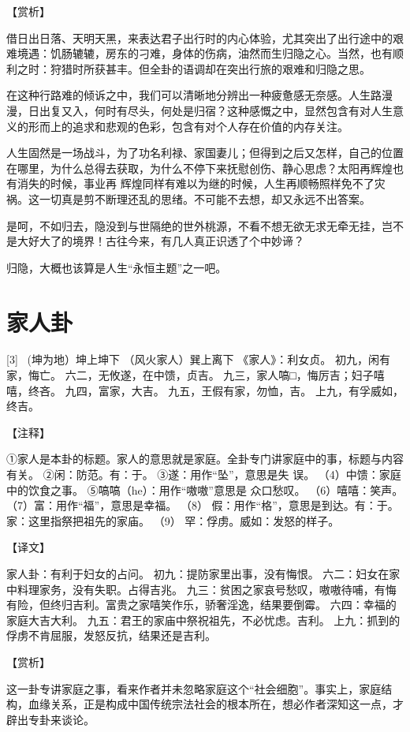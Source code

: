 \documentclass[12pt,UTF8]{ctexbook}
\begin{document}
【赏析】

借日出日落、天明天黑，来表达君子出行时的内心体验，尤其突出了出行途中的艰难境遇：饥肠辘辘，房东的刁难，身体的伤病，油然而生归隐之心。当然，也有顺利之时：狩猎时所获甚丰。但全卦的语调却在突出行旅的艰难和归隐之思。

在这种行路难的倾诉之中，我们可以清晰地分辨出一种疲惫感无奈感。人生路漫漫，日出复又入，何时有尽头，何处是归宿？这种感慨之中，显然包含有对人生意义的形而上的追求和悲观的色彩，包含有对个人存在价值的内存关注。

人生固然是一场战斗，为了功名利禄、家国妻儿；但得到之后又怎样，自己的位置在哪里，为什么总得去获取，为什么不停下来抚慰创伤、静心思虑？太阳再辉煌也有消失的时候，事业再 辉煌同样有难以为继的时候，人生再顺畅照样免不了灾祸。这一切真是剪不断理还乱的思绪。不可能不去想，却又永远不出答案。

是呵，不如归去，隐没到与世隔绝的世外桃源，不看不想无欲无求无牵无挂，岂不是大好大了的境界！古往今来，有几人真正识透了个中妙谛？

归隐，大概也该算是人生“永恒主题”之一吧。

\chapter{家人卦}
[3] \ (坤为地）坤上坤下
（风火家人）巽上离下
《家人》：利女贞。
初九，闲有家，悔亡。
六二，无攸遂，在中馈，贞吉。
九三，家人嗃□，悔厉吉；妇子嘻嘻，终吝。
九四，富家，大吉。
九五，王假有家，勿恤，吉。
上九，有孚威如，终吉。

【注释】

①家人是本卦的标题。家人的意思就是家庭。全卦专门讲家庭中的事，标题与内容有关。
②闲：防范。有：于。
③遂：用作“坠”，意思是失 误。
（4）中馈：家庭中的饮食之事。
⑤嗃嗃（he）：用作“嗷嗷”意思是 众口愁叹。
（6）嘻嘻：笑声。
（7）富：用作“福”，意思是幸福。
（8） 假：用作“格”，意思是到达。有：于。家：这里指祭把祖先的家庙。
（9） 罕：俘虏。威如：发怒的样子。

【译文】

家人卦：有利于妇女的占问。
初九：提防家里出事，没有悔恨。
六二：妇女在家中料理家务，没有失职。占得吉兆。
九三：贫困之家哀号愁叹，嗷嗷待哺，有悔有险，但终归吉利。富贵之家嘻笑作乐，骄奢淫逸，结果要倒霉。
六四：幸福的家庭大吉大利。
九五：君王的家庙中祭祝祖先，不必忧虑。吉利。
上九：抓到的俘虏不肯屈服，发怒反抗，结果还是吉利。

【赏析】

这一卦专讲家庭之事，看来作者并未忽略家庭这个“社会细胞”。事实上，家庭结构，血缘关系，正是构成中国传统宗法社会的根本所在，想必作者深知这一点，才辟出专卦来谈论。
\end{document}

